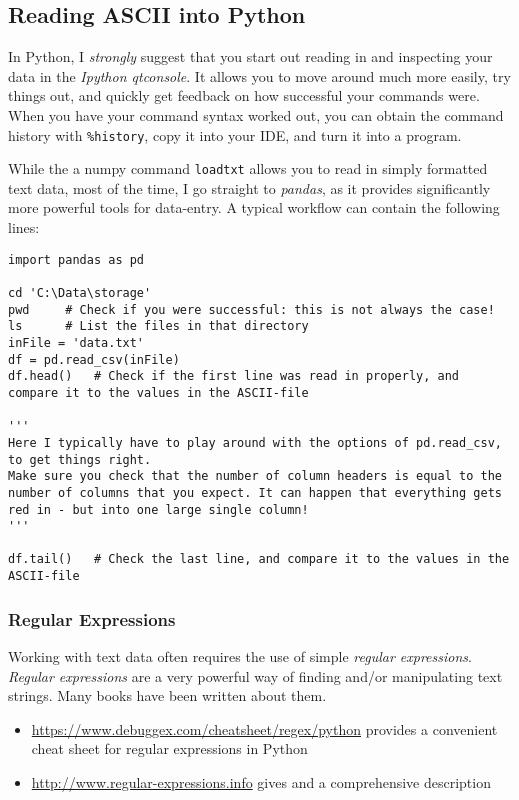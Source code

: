\subsection{Reading ASCII into Python}

In Python, I \emph{strongly} suggest that you start out reading in and inspecting your data in the \emph{Ipython qtconsole}. It allows you to move around much more easily, try things out, and quickly get feedback on how successful your commands were. When you have your command syntax worked out, you can obtain the command history with \lstinline{%history}, copy it into your IDE, and turn it into a program.

While the a numpy command \lstinline{loadtxt} allows you to read in simply formatted text data, most of the time, I go straight to \emph{pandas}, as it provides significantly more powerful tools for data-entry. A typical workflow can contain the following lines:

\begin{lstlisting}
import pandas as pd

cd 'C:\Data\storage'
pwd     # Check if you were successful: this is not always the case!
ls      # List the files in that directory
inFile = 'data.txt'
df = pd.read_csv(inFile)
df.head()   # Check if the first line was read in properly, and compare it to the values in the ASCII-file

'''
Here I typically have to play around with the options of pd.read_csv, to get things right.
Make sure you check that the number of column headers is equal to the number of columns that you expect. It can happen that everything gets red in - but into one large single column!
'''

df.tail()   # Check the last line, and compare it to the values in the ASCII-file
\end{lstlisting}

\subsubsection{Regular Expressions}

Working with text data often requires the use of simple \emph{regular expressions}. \emph{Regular expressions} are a very powerful way of finding and/or manipulating text strings. Many books have been written about them.

\begin{itemize}
  \item \url{https://www.debuggex.com/cheatsheet/regex/python} provides a convenient cheat sheet for regular expressions in Python
  \item \url{http://www.regular-expressions.info} gives and a comprehensive description
\end{itemize}

